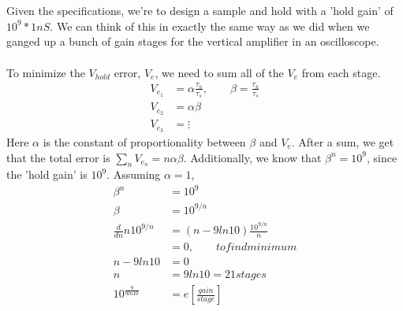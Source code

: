 \documentclass{article}
\begin{document}
\section{}
Given the specifications, we're to design a sample and hold with a 'hold gain' of $10^9*1nS$.  
We can think of this in exactly the same way as we did when we ganged up a bunch of gain stages
for the vertical amplifier in an oscilloscope.  \\
\\
To minimize the $V_{hold}$ error, $V_e$, we need to sum all of the $V_e$ from each stage.\\
\begin{align*}
V_{e_1} &=\alpha \frac{\tau_h}{\tau_s}, \qquad \beta = \frac{\tau_h}{\tau_s}\\
V_{e_2} &=\alpha \beta\\
V_{e_3} &= \vdots 
\end{align*} 
Here $\alpha$ is the constant of proportionality between $\beta$ and $V_e$.  After a sum, we get that the total 
error is $\sum_n{V_{e_n}}=n\alpha \beta$.  Additionally, we know that $\beta^n=10^9$, since the 'hold gain' is $10^9$.
Assuming $\alpha=1$,
\begin{align*}
\beta^n &= 10^9 \\
\beta &= 10^{9/n} \\
\frac{d}{dn}n10^{9/n} &= (n-9ln10) \frac{10^{9/n}}{n} \\
&= 0, \qquad to find minimum \\
n-9ln10 &= 0 \\
n &= 9ln10 = 21 stages \\
\displaystyle 10^{\frac{9}{9ln10}} &= e [\frac{gain}{stage}]
\end{align*}
\end{document}
